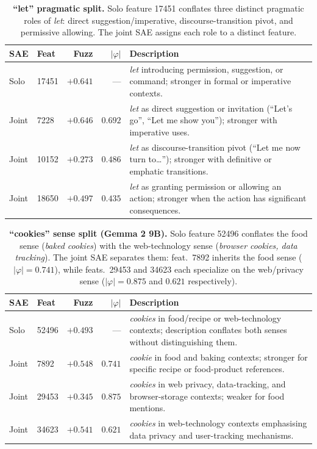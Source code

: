 \begin{table}[t]
\centering
\caption{\textbf{``let'' pragmatic split.} Solo feature 17451 conflates three
distinct pragmatic roles of \textit{let}: direct suggestion/imperative,
discourse-transition pivot, and permissive allowing.  The joint SAE assigns
each role to a distinct feature.}
\label{tab:qual_let}
\small
\begin{tabular}{llrrl}
\toprule
SAE & Feat & Fuzz & $|\varphi|$ & Description \\
\midrule
Solo & 17451 & $+0.641$ & — &
  \textit{let} introducing permission, suggestion, or command;
  stronger in formal or imperative contexts. \\[4pt]
\midrule
Joint & 7228 & $+0.646$ & $0.692$ &
  \textit{let} as direct suggestion or invitation
  (``Let's go'', ``Let me show you'');
  stronger with imperative uses. \\[3pt]
Joint & 10152 & $+0.273$ & $0.486$ &
  \textit{let} as discourse-transition pivot
  (``Let me now turn to\ldots'');
  stronger with definitive or emphatic transitions. \\[3pt]
Joint & 18650 & $+0.497$ & $0.435$ &
  \textit{let} as granting permission or allowing an action;
  stronger when the action has significant consequences. \\
\bottomrule
\end{tabular}
\end{table}

\begin{table}[t]
\centering
\caption{\textbf{``cookies'' sense split (Gemma 2 9B).} Solo feature 52496
conflates the food sense (\textit{baked cookies}) with the web-technology
sense (\textit{browser cookies, data tracking}).  The joint SAE separates
them: feat.\ 7892 inherits the food sense ($|\varphi|\!=\!0.741$), while
feats.\ 29453 and 34623 each specialize on the web/privacy sense
($|\varphi|\!=\!0.875$ and $0.621$ respectively).}
\label{tab:qual_cookies}
\small
\begin{tabular}{llrrl}
\toprule
SAE & Feat & Fuzz & $|\varphi|$ & Description \\
\midrule
Solo & 52496 & $+0.493$ & — &
  \textit{cookies} in food/recipe or web-technology contexts;
  description conflates both senses without distinguishing them. \\[4pt]
\midrule
Joint & 7892 & $+0.548$ & $0.741$ &
  \textit{cookie} in food and baking contexts;
  stronger for specific recipe or food-product references. \\[3pt]
Joint & 29453 & $+0.345$ & $0.875$ &
  \textit{cookies} in web privacy, data-tracking, and browser-storage
  contexts; weaker for food mentions. \\[3pt]
Joint & 34623 & $+0.541$ & $0.621$ &
  \textit{cookies} in web-technology contexts emphasising data privacy
  and user-tracking mechanisms. \\
\bottomrule
\end{tabular}
\end{table}

